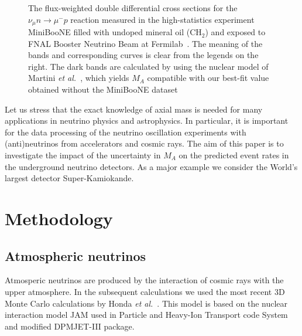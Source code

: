 \documentclass[preprint]{elsarticle}
\begin{document}
\begin{figure}[h!]
\begin{center}
\caption{\label{MiniBooNE}The flux-weighted double differential cross sections for the $\nu_{\mu}n\to\mu^-p$ reaction measured in the high-statistics experiment MiniBooNE filled with undoped mineral oil (CH$_2$) and exposed to FNAL Booster Neutrino Beam at Fermilab~\cite{AguilarArevalo:2010zc}. The meaning of the bands and corresponding curves is clear from the legends on the right. The dark bands are calculated by using the nuclear model of Martini \textit{et al.}~\cite{Martini:2011wp}, which yields $M_A$ compatible with our best-fit value obtained without the MiniBooNE dataset}
\label{MiniBooNE}
\end{center}
\end{figure}

Let us stress that the exact knowledge of axial mass is needed for many applications in neutrino physics and astrophysics. In particular, it is important for the data processing of the neutrino oscillation experiments with (anti)neutrinos from accelerators and cosmic rays. The aim of this paper is to investigate the impact of the uncertainty in $M_A$ on the predicted event rates in the underground neutrino detectors. As a major example we consider the World's largest detector Super-Kamiokande.

\section{Methodology}
\subsection{Atmospheric neutrinos}
Atmosperic neutrinos are produced by the interaction of cosmic rays with the upper atmosphere. In the subsequent calculations we used the most recent 3D Monte Carlo calculations by Honda \textit{et al.}~\cite{Honda:2011nf}. This model is based on the nuclear interaction model JAM used in Particle and Heavy-Ion Transport code System and modified DPMJET-III package.
\end{document}
